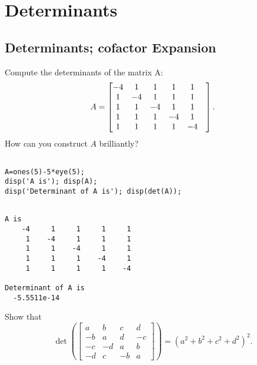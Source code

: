 \chapter {Determinants}

\section{Determinants; cofactor Expansion}

\begin{exer}
Compute the determinants of the matrix A:
\begin{equation*}
A=\begin{bmatrix}-4 & 1 & 1 & 1 & 1 & \\ 1 & -4 & 1 & 1 & 1 \\ 1 & 1 & -4 & 1 & 1 \\ 1 & 1 & 1 & -4 & 1 \\ 1 & 1 & 1 & 1 & -4\end{bmatrix}\\.
\end{equation*}
How can you construct $A$ brilliantly?
\end{exer}

\begin{sol}

\begin{verbatim}

A=ones(5)-5*eye(5);
disp('A is'); disp(A);
disp('Determinant of A is'); disp(det(A));
\end{verbatim}

\begin{outputs}
\begin{verbatim}

A is
    -4     1     1     1     1
     1    -4     1     1     1
     1     1    -4     1     1
     1     1     1    -4     1
     1     1     1     1    -4

Determinant of A is
  -5.5511e-14
\end{verbatim}
\end{outputs}
\end{sol}

\vspace{3mm}

\begin{exer}
Show that 
$$\det\left(\begin{bmatrix} \displaystyle a & b & c & d \\ -b & a & d & -c \\ -c & -d & a & b \\ -d & c & -b & a \end{bmatrix}\right)=(a^2+b^2+c^2+d^2)^2.$$
\end{exer}

